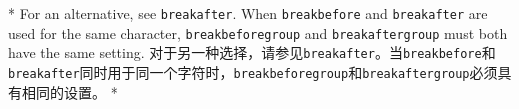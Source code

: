 \begin{paracol}{2}
\begin{optionlist}
\switchcolumn[0]*%
 For an alternative, see \texttt{breakafter}.  When \texttt{breakbefore} and \texttt{breakafter} are used for the same character, \texttt{breakbeforegroup} and \texttt{breakaftergroup} must both have the same setting.
 \switchcolumn
对于另一种选择，请参见\texttt{breakafter}。当\texttt{breakbefore}和\texttt{breakafter}同时用于同一个字符时，\texttt{breakbeforegroup}和\texttt{breakaftergroup}必须具有相同的设置。
\switchcolumn[0]*%

\end{optionlist}
\end{paracol}
